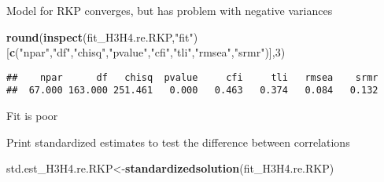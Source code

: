 \documentclass[
]{article}
\newenvironment{Shaded}{\begin{snugshade}}{\end{snugshade}}
\newcommand{\DecValTok}[1]{\textcolor[rgb]{0.00,0.00,0.81}{#1}}
\newcommand{\KeywordTok}[1]{\textcolor[rgb]{0.13,0.29,0.53}{\textbf{#1}}}
\newcommand{\NormalTok}[1]{#1}
\newcommand{\StringTok}[1]{\textcolor[rgb]{0.31,0.60,0.02}{#1}}
\begin{document}
Model for RKP converges, but has problem with negative variances

\begin{Shaded}
\begin{Highlighting}[]
\KeywordTok{round}\NormalTok{(}\KeywordTok{inspect}\NormalTok{(fit_H3H4.re.RKP,}\StringTok{"fit"}\NormalTok{)}
\NormalTok{      [}\KeywordTok{c}\NormalTok{(}\StringTok{"npar"}\NormalTok{,}\StringTok{"df"}\NormalTok{,}\StringTok{"chisq"}\NormalTok{,}\StringTok{"pvalue"}\NormalTok{,}\StringTok{"cfi"}\NormalTok{,}\StringTok{"tli"}\NormalTok{,}\StringTok{"rmsea"}\NormalTok{,}\StringTok{"srmr"}\NormalTok{)],}\DecValTok{3}\NormalTok{)}
\end{Highlighting}
\end{Shaded}

\begin{verbatim}
##    npar      df   chisq  pvalue     cfi     tli   rmsea    srmr 
##  67.000 163.000 251.461   0.000   0.463   0.374   0.084   0.132
\end{verbatim}

Fit is poor

Print standardized estimates to test the difference between correlations

\begin{Shaded}
\begin{Highlighting}[]
\NormalTok{std.est_H3H4.re.RKP<-}\KeywordTok{standardizedsolution}\NormalTok{(fit_H3H4.re.RKP)}
\end{Highlighting}
\end{Shaded}
\end{document}
